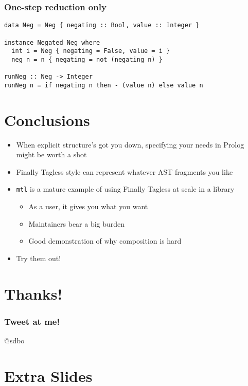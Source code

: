 \documentclass[pdf]{beamer}
\begin{document}
\begin{frame}[fragile]
  \frametitle{One-step reduction only}
\begin{lstlisting}
data Neg = Neg { negating :: Bool, value :: Integer }

instance Negated Neg where
  int i = Neg { negating = False, value = i }
  neg n = n { negating = not (negating n) }

runNeg :: Neg -> Integer
runNeg n = if negating n then - (value n) else value n
\end{lstlisting}
\end{frame}

\section{Conclusions}

\begin{frame}
  \begin{itemize}
    \pause
  \item When explicit structure's got you down, specifying your needs in Prolog
    might be worth a shot \pause
  \item Finally Tagless style can represent whatever AST fragments you like \pause
  \item \texttt{mtl} is a mature example of using Finally Tagless at scale in a library \pause
    \begin{itemize}
    \item As a user, it gives you what you want \pause
    \item Maintainers bear a big burden \pause
    \item Good demonstration of why composition is hard \pause
    \end{itemize}
  \item Try them out!
  \end{itemize}
\end{frame}

\section{Thanks!}

\begin{frame}
  \frametitle{Tweet at me!}
  \begin{center}
    @sdbo
  \end{center}
\end{frame}

\section{Extra Slides}
\end{document}
